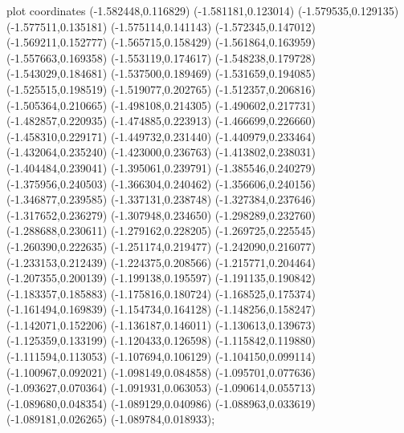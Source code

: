 { plot coordinates {(-1.582448,0.116829) (-1.581181,0.123014) (-1.579535,0.129135) (-1.577511,0.135181) (-1.575114,0.141143) (-1.572345,0.147012) (-1.569211,0.152777) (-1.565715,0.158429) (-1.561864,0.163959) (-1.557663,0.169358) (-1.553119,0.174617) (-1.548238,0.179728) (-1.543029,0.184681) (-1.537500,0.189469) (-1.531659,0.194085) (-1.525515,0.198519) (-1.519077,0.202765) (-1.512357,0.206816) (-1.505364,0.210665) (-1.498108,0.214305) (-1.490602,0.217731) (-1.482857,0.220935) (-1.474885,0.223913) (-1.466699,0.226660) (-1.458310,0.229171) (-1.449732,0.231440) (-1.440979,0.233464) (-1.432064,0.235240) (-1.423000,0.236763) (-1.413802,0.238031) (-1.404484,0.239041) (-1.395061,0.239791) (-1.385546,0.240279) (-1.375956,0.240503) (-1.366304,0.240462) (-1.356606,0.240156) (-1.346877,0.239585) (-1.337131,0.238748) (-1.327384,0.237646) (-1.317652,0.236279) (-1.307948,0.234650) (-1.298289,0.232760) (-1.288688,0.230611) (-1.279162,0.228205) (-1.269725,0.225545) (-1.260390,0.222635) (-1.251174,0.219477) (-1.242090,0.216077) (-1.233153,0.212439) (-1.224375,0.208566) (-1.215771,0.204464) (-1.207355,0.200139) (-1.199138,0.195597) (-1.191135,0.190842) (-1.183357,0.185883) (-1.175816,0.180724) (-1.168525,0.175374) (-1.161494,0.169839) (-1.154734,0.164128) (-1.148256,0.158247) (-1.142071,0.152206) (-1.136187,0.146011) (-1.130613,0.139673) (-1.125359,0.133199) (-1.120433,0.126598) (-1.115842,0.119880) (-1.111594,0.113053) (-1.107694,0.106129) (-1.104150,0.099114) (-1.100967,0.092021) (-1.098149,0.084858) (-1.095701,0.077636) (-1.093627,0.070364) (-1.091931,0.063053) (-1.090614,0.055713) (-1.089680,0.048354) (-1.089129,0.040986) (-1.088963,0.033619) (-1.089181,0.026265) (-1.089784,0.018933)};
}

